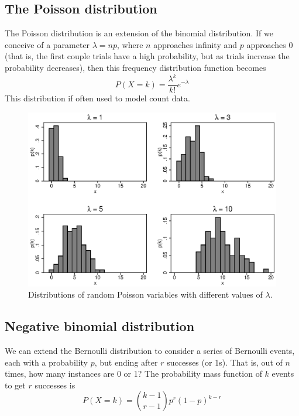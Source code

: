\subsection{The Poisson distribution}
\label{sec:poisson}
The Poisson distribution is an extension of the binomial distribution. If we conceive of a parameter $\lambda = np$, where $n$ approaches infinity and $p$ approaches 0 (that is, the first couple trials have a high probability, but as trials increase the probability decreases), then this frequency distribution function becomes
\begin{equation}\label{eq:poisson}
P\left(X=k\right) = \frac{\lambda^k}{k!}e^{-\lambda}
\end{equation}
This distribution if often used to model count data.
\begin{figure}
   \centering
   \includegraphics[angle=0,
           width=.75\textwidth]{poisson.eps}
   \caption{Distributions of random Poisson variables with different values of $\lambda$.}
  \label{fig:poisson}
\end{figure}

\subsection{Negative binomial distribution}
\label{sec:negbinomial}
We can extend the Bernoulli distribution to consider a series of Bernoulli events, each with a probability $p$, but ending after $r$ successes (or 1s). That is, out of $n$ times, how many instances are 0 or 1? The probability mass function of $k$ events to get $r$ successes is
\begin{equation}
\label{eq:negbinomial}
P(X=k) = {k-1 \choose r-1}p^r(1-p)^{k-r}
\end{equation}

